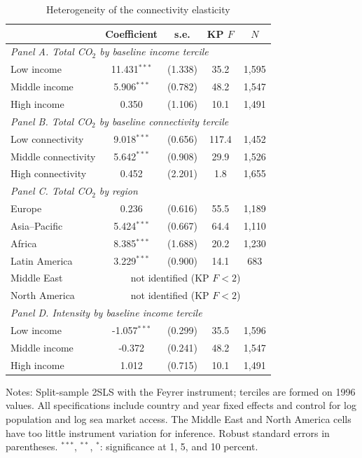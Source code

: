 \documentclass[11pt]{article}
\begin{document}
\begin{table}[htbp]
\centering
\begin{threeparttable}
\caption{Heterogeneity of the connectivity elasticity}
\label{tab:hetero}
\footnotesize
\begin{tabular}{lcccc}
\toprule
 & Coefficient & s.e. & KP $F$ & $N$ \\
\midrule
\multicolumn{5}{l}{\textit{Panel A. Total CO$_2$ by baseline income tercile}} \\
  Low income & 11.431$^{***}$ & (1.338) & 35.2 & 1,595 \\
  Middle income & 5.906$^{***}$ & (0.782) & 48.2 & 1,547 \\
  High income & 0.350 & (1.106) & 10.1 & 1,491 \\
\midrule
\multicolumn{5}{l}{\textit{Panel B. Total CO$_2$ by baseline connectivity tercile}} \\
  Low connectivity & 9.018$^{***}$ & (0.656) & 117.4 & 1,452 \\
  Middle connectivity & 5.642$^{***}$ & (0.908) & 29.9 & 1,526 \\
  High connectivity & 0.452 & (2.201) & 1.8 & 1,655 \\
\midrule
\multicolumn{5}{l}{\textit{Panel C. Total CO$_2$ by region}} \\
  Europe & 0.236 & (0.616) & 55.5 & 1,189 \\
  Asia--Pacific & 5.424$^{***}$ & (0.667) & 64.4 & 1,110 \\
  Africa & 8.385$^{***}$ & (1.688) & 20.2 & 1,230 \\
  Latin America & 3.229$^{***}$ & (0.900) & 14.1 & 683 \\
  Middle East & \multicolumn{4}{c}{not identified (KP $F<2$)} \\
  North America & \multicolumn{4}{c}{not identified (KP $F<2$)} \\
\midrule
\multicolumn{5}{l}{\textit{Panel D. Intensity by baseline income tercile}} \\
  Low income & -1.057$^{***}$ & (0.299) & 35.5 & 1,596 \\
  Middle income & -0.372 & (0.241) & 48.2 & 1,547 \\
  High income & 1.012 & (0.715) & 10.1 & 1,491 \\
\bottomrule
\end{tabular}
\begin{tablenotes}[flushleft]
\footnotesize
\item Notes: Split-sample 2SLS with the Feyrer instrument; terciles are formed on 1996 values. All specifications include country and year fixed effects and control for log population and log sea market access. The Middle East and North America cells have too little instrument variation for inference. Robust standard errors in parentheses. $^{***}$, $^{**}$, $^{*}$: significance at 1, 5, and 10 percent.
\end{tablenotes}
\end{threeparttable}
\end{table}
\end{document}
